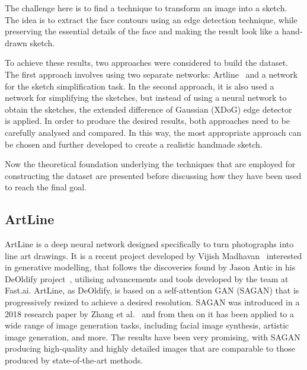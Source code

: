 \noindent The challenge here is to find a technique to transform an image into a sketch. The idea is to extract the face contours using an edge detection technique, while preserving the essential details of the face and making the result look like a hand-drawn sketch.

\noindent To achieve these results, two approaches were considered to build the dataset. The first approach involves using two separate networks: Artline~\cite{artline} and a network for the sketch simplification task. In the second approach, it is also used a network for simplifying the sketches, but instead of using a neural network to obtain the sketches, the extended difference of Gaussian (XDoG) edge detector~\cite{xdog} is applied.
In order to produce the desired results, both approaches need to be carefully analysed and compared. In this way, the most appropriate approach can be chosen and further developed to create a realistic handmade sketch.

\noindent Now the theoretical foundation underlying the techniques that are employed for constructing the dataset are presented before discussing how they have been used to reach the final goal.

\subsection{ArtLine}
ArtLine is a deep neural network designed specifically to turn photographs into line art drawings. It is a recent project developed by Vijish Madhavan~\cite{artline} interested in generative modelling, that follows the discoveries found by Jason Antic in his DeOldify project~\cite{deoldify}, utilising advancements and tools developed by the team at Fast.ai. ArtLine, as DeOldify, is based on a self-attention GAN (SAGAN) that is progressively resized to achieve a desired resolution. SAGAN was introduced in a 2018 research paper by Zhang et al.~\cite{SaGAN} and from then on it has been applied to a wide range of image generation tasks, including facial image synthesis, artistic image generation, and more. The results have been very promising, with SAGAN producing high-quality and highly detailed images that are comparable to those produced by state-of-the-art methods.

